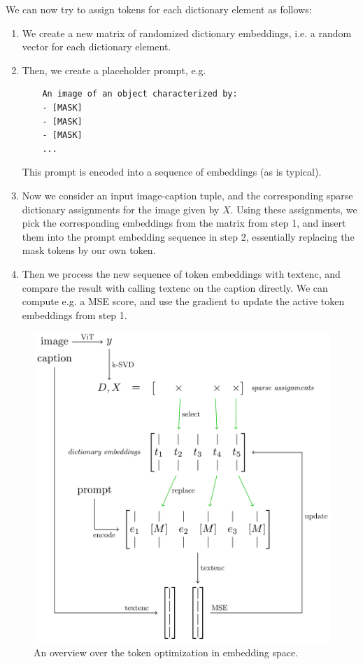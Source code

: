 \documentclass[11pt]{article}
\begin{document}
We can now try to assign tokens for each dictionary element as follows:
\begin{enumerate}
\item We create a new matrix of randomized dictionary embeddings, i.e. a random vector for each dictionary element.
\item Then, we create a placeholder prompt, e.g.
\begin{verbatim}
    An image of an object characterized by:
    - [MASK]
    - [MASK]
    - [MASK]
    ...
\end{verbatim}
This prompt is encoded into a sequence of embeddings (as is typical).
\item Now we consider an input image-caption tuple, and the corresponding sparse dictionary assignments for the image given by \(X\).
Using these assignments, we pick the corresponding embeddings from the matrix from step 1, and insert them into the prompt embedding sequence in step 2, essentially replacing the mask tokens by our own token.
\item Then we process the new sequence of token embeddings with \(\mathrm{textenc}\), and compare the result with calling \(\mathrm{textenc}\) on the caption directly.
We can compute e.g. a MSE score, and use the gradient to update the active token embeddings from step 1.
\end{enumerate}

\begin{figure}[htbp]
\centering
\includegraphics[width=.9\linewidth]{./tikz-pictures/token-optimization-1/main.png}
\caption{An overview over the token optimization in embedding space.}
\end{figure}
\end{document}
